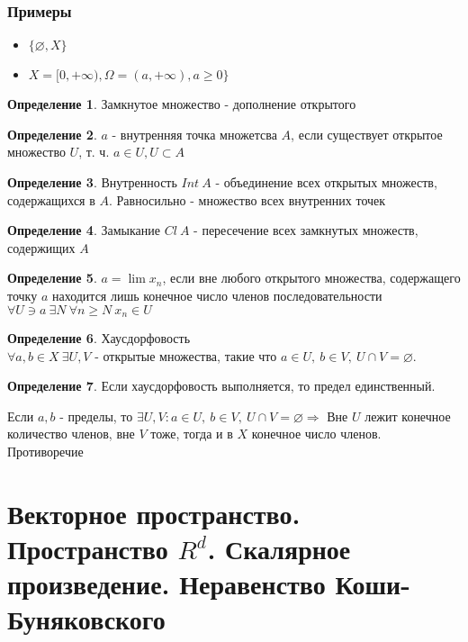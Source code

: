 \documentclass[12pt,letterpaper]{report}
\makeatletter
\theoremstyle{definition}
\newtheorem*{conj}{Определение}
\renewenvironment{proof}[1][\proofname]{%
   \par\pushQED{\qed}\normalfont%
   \topsep6\p@\@plus6\p@\relax
   \trivlist\item[\hskip\labelsep\bfseries#1\@addpunct{.}]%
   \ignorespaces
}{%
   \popQED\endtrivlist\@endpefalse
}
\makeatother
\begin{document}
    \subsubsection*{Примеры}
    \begin{itemize}
        \item[] $\{\varnothing, X\}$
        \item[] $X = [0, +\infty), \Omega = (a, +\infty), a\geq 0\}$
    \end{itemize}  

    \begin{conj}
        Замкнутое множество - дополнение открытого
    \end{conj}
    \begin{conj}
        $a$ - внутренняя точка множетсва $A$, если существует открытое множество $U$, т. ч. $a \in U, U\subset A$
    \end{conj}
    \begin{conj}
        Внутренность $Int\ A$ - объединение всех открытых множеств, содержащихся в $A$. Равносильно - множество всех внутренних точек
    \end{conj}
    \begin{conj}
        Замыкание $Cl\ A$ - пересечение всех замкнутых множеств, содержищих $A$
    \end{conj}
    \begin{conj}
        $a = \lim x_n$, если вне любого открытого множества, содержащего точку $a$ находится лишь конечное число членов последовательности \\
        $\forall U \ni a\ \exists N\ \forall n\geq N\ x_n \in U$
    \end{conj}
    \begin{conj}
        Хаусдорфовость \\
        $\forall a, b \in X \ \exists U, V$ - открытые множества, такие что $a\in U,\ b\in V,\ U\cap V = \varnothing$.
    \end{conj}
    \begin{conj} 
        Если хаусдорфовость выполняется, то предел единственный.
        \begin{proof}
            Если $a, b$ - пределы, то $\exists U, V : a\in U,\ b\in V,\ U\cap V = \varnothing \Longrightarrow $ Вне $U$ лежит конечное количество членов, вне $V$ тоже, тогда и в $X$ конечное число членов. Противоречие
        \end{proof}
    \end{conj}

    \section{Векторное пространство. Пространство $R^d$. Скалярное произведение. Неравенство Коши-Буняковского}
    
\end{document}
